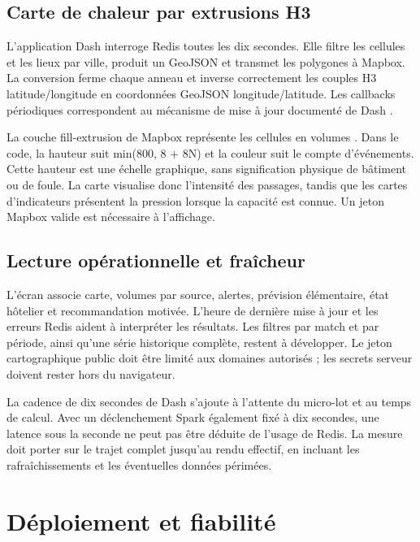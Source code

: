 \documentclass[a4paper,11pt]{article}
\begin{document}
\subsection{Carte de chaleur par extrusions H3}
L'application Dash interroge Redis toutes les dix secondes. Elle filtre les cellules et les lieux par ville, produit un GeoJSON et transmet les polygones à Mapbox. La conversion ferme chaque anneau et inverse correctement les couples H3 latitude/longitude en coordonnées GeoJSON longitude/latitude. Les callbacks périodiques correspondent au mécanisme de mise à jour documenté de Dash \cite{ref7}.
\par
La couche {\small\ttfamily fill-extrusion} de Mapbox représente les cellules en volumes \cite{ref8}. Dans le code, la hauteur suit min(800, 8 + 8N) et la couleur suit le compte d'événements. Cette hauteur est une échelle graphique, sans signification physique de bâtiment ou de foule. La carte visualise donc l'intensité des passages, tandis que les cartes d'indicateurs présentent la pression lorsque la capacité est connue. Un jeton Mapbox valide est nécessaire à l'affichage.
\par
\subsection{Lecture opérationnelle et fraîcheur}
L'écran associe carte, volumes par source, alertes, prévision élémentaire, état hôtelier et recommandation motivée. L'heure de dernière mise à jour et les erreurs Redis aident à interpréter les résultats. Les filtres par match et par période, ainsi qu'une série historique complète, restent à développer. Le jeton cartographique public doit être limité aux domaines autorisés ; les secrets serveur doivent rester hors du navigateur.
\par
La cadence de dix secondes de Dash s'ajoute à l'attente du micro-lot et au temps de calcul. Avec un déclenchement Spark également fixé à dix secondes, une latence sous la seconde ne peut pas être déduite de l'usage de Redis. La mesure doit porter sur le trajet complet jusqu'au rendu effectif, en incluant les rafraîchissements et les éventuelles données périmées.
\par

\clearpage
\section{Déploiement et fiabilité}\label{sec:7}
\end{document}
